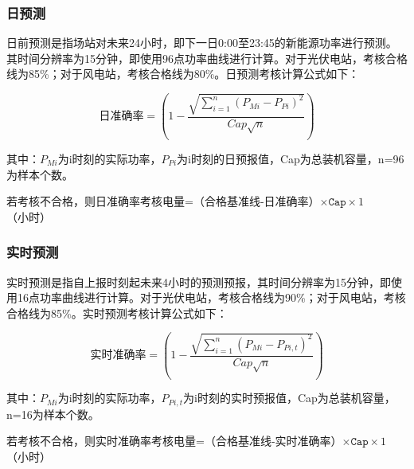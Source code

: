 \documentclass[winfonts,UTF8,a4paper]{ctexart}
\begin{document}
\subsubsection{日预测}
日前预测是指场站对未来24小时，即下一日0:00至23:45的新能源功率进行预测。其时间分辨率为15分钟，即使用96点功率曲线进行计算。对于光伏电站，考核合格线为85\%；对于风电站，考核合格线为80\%。日预测考核计算公式如下：
%	
%	
%	

\begin{equation}\label{pre_wind_day}
	\texttt{日准确率}=(1-\dfrac{\sqrt{\sum\limits_{i=1}^{n}(P_{Mi}-P_{Pi})^2}}{Cap\sqrt{n}})
\end{equation}

其中：$ P_{Mi} $为i时刻的实际功率，$ P_{Pi} $为i时刻的日预报值，Cap为总装机容量，n=96为样本个数。

若考核不合格，则日准确率考核电量=（合格基准线-日准确率）$ \times \texttt{Cap}\times 1 $（小时）

\subsubsection{实时预测}
实时预测是指自上报时刻起未来4小时的预测预报，其时间分辨率为15分钟，即使用16点功率曲线进行计算。对于光伏电站，考核合格线为90\%；对于风电站，考核合格线为85\%。实时预测考核计算公式如下：

%	
\begin{equation}\label{pre_wind_rt}
	\texttt{实时准确率}=(1-\dfrac{\sqrt{\sum\limits_{i=1}^{n}(P_{Mi}-P_{Pi,t})^2}}{Cap\sqrt{n}})
\end{equation}

其中：$ P_{Mi} $为i时刻的实际功率，$ P_{Pi,t} $为i时刻的实时预报值，Cap为总装机容量，n=16为样本个数。

若考核不合格，则实时准确率考核电量=（合格基准线-实时准确率）$ \times \texttt{Cap}\times 1 $（小时）
\end{document}
